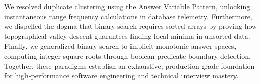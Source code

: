 \documentclass[10pt,journal,compsoc,onecolumn]{IEEEtran}
\begin{document}
We resolved duplicate clustering using the Answer Variable Pattern, unlocking instantaneous range frequency calculations in database telemetry. Furthermore, we dispelled the dogma that binary search requires sorted arrays by proving how topographical valley descent guarantees finding local minima in unsorted data. Finally, we generalized binary search to implicit monotonic answer spaces, computing integer square roots through boolean predicate boundary detection. Together, these paradigms establish an exhaustive, production-grade foundation for high-performance software engineering and technical interview mastery.
\end{document}
